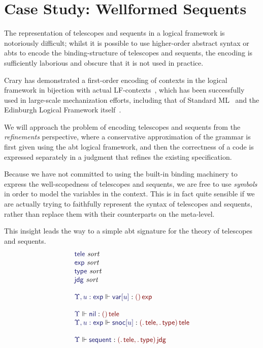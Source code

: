 \documentclass[11pt]{article}
\theoremstyle{definition}
\theoremstyle{remark}
\numberwithin{equation}{section}
\def\IModeColorName{MidnightBlue}
\def\OModeColorName{Maroon}
\newcommand\IMode[1]{{\color{\IModeColorName}{#1}}}
\newcommand\OMode[1]{{\color{\OModeColorName}{#1}}}
\newcommand\MkValence[3]{%
  \ifthenelse{\equal{#1}{}}{}{%
    \{#1\}%
  }%
  \ifthenelse{\equal{#2}{}}{}{%
    [#2]%
  }.\, #3%
}
\newcommand\MkArity[2]{(#1)\, #2}
\newcommand\IsSort[1]{\IMode{#1}\ \textit{sort}}
\newcommand\IsOperator[3]{\IMode{#1}\Vdash\IMode{#2}: \OMode{#3}}
\begin{document}
\section{Case Study: Wellformed Sequents}

The representation of telescopes and sequents in a logical framework is
notoriously difficult; whilst it is possible to use higher-order abstract
syntax or abts to encode the binding-structure of telescopes
and sequents, the encoding is sufficiently laborious and obscure that it is not
used in practice.

Crary has demonstrated a first-order encoding of contexts in the logical
framework in bijection with actual LF-contexts~\cite{crary:2009}, which has
been successfully used in large-scale mechanization efforts, including that of
Standard ML~\cite{lee-crary-harper:2007} and the Edinburgh Logical Framework
itself~\cite{martens-crary:2012}.


We will approach the problem of encoding telescopes and sequents from the
\emph{refinements} perspective, where a conservative approximation of the
grammar is first given using the abt logical framework, and then the
correctness of a code is expressed separately in a judgment that refines the
existing specification.

Because we have not committed to using the built-in binding machinery to
express the well-scopedness of telescopes and sequents, we are free to use
\emph{symbols} in order to model the variables in the context. This is in fact
quite sensible if we are actually trying to faithfully represent the syntax of
telescopes and sequents, rather than replace them with their counterparts on
the meta-level.

This insight leads the way to a simple abt signature for the theory of telescopes
and sequents.
%
\newcommand\SortTele{\mathsf{tele}}
\newcommand\SortJdg{\mathsf{jdg}}
\newcommand\SortType{\mathsf{type}}
\newcommand\SortExpr{\mathsf{exp}}
\newcommand\OpNil{\mathsf{nil}}
\newcommand\OpSnoc[1]{\mathsf{snoc}[#1]}
\newcommand\OpVar[1]{\mathsf{var}[#1]}
\newcommand\OpSequent{\mathsf{sequent}}
%
\[
  \begin{array}{l}
    \IsSort{\SortTele}\\
    \IsSort{\SortExpr}\\
    \IsSort{\SortType}\\
    \IsSort{\SortJdg}\\\\
    \IsOperator{\Upsilon, u:\SortExpr}{\OpVar{u}}{
      \MkArity{}{\SortExpr}
    }\\\\
    \IsOperator{\Upsilon}{\OpNil}{
      \MkArity{}{\SortTele}
    }\\
    \IsOperator{\Upsilon, u:\SortExpr}{\OpSnoc{u}}{
      \MkArity{
        \MkValence{}{}{\SortTele},
        \MkValence{}{}{\SortType}
      }{\SortTele}
    }\\\\
    \IsOperator{\Upsilon}{\OpSequent}{
      \MkArity{
        \MkValence{}{}{\SortTele},
        \MkValence{}{}{\SortType}
      }{\SortJdg}
    }
  \end{array}
\]
\end{document}
